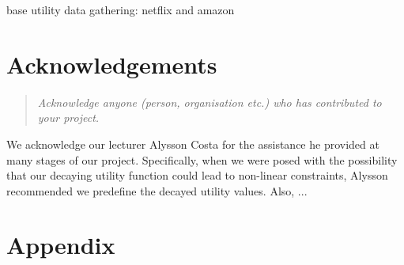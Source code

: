 \documentclass[12pt]{article}
\begin{document}
base utility data gathering: netflix and amazon


\pagebreak

\section{Acknowledgements}
\label{sec:acknow}


\begin{quote} \textit{
Acknowledge anyone (person, organisation etc.) who has contributed to your project.
} \end{quote}

We acknowledge our lecturer Alysson Costa for the assistance he provided at many stages of our project. Specifically, when we were posed with the possibility that our decaying utility function could lead to non-linear constraints, Alysson recommended we predefine the decayed utility values. Also, ...





\section{Appendix}
\label{sec:appen}
\end{document}
